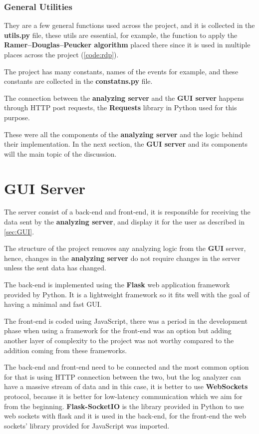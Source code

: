 \subsubsection{General Utilities}
They are a few general functions used across the project, and it is collected in the \textbf{utils.py} file,
these utils are essential, for example, the function to apply the \textbf{Ramer–Douglas–Peucker algorithm}
placed there since it is used in multiple places across the project (\ref{code:rdp}).

The project has many constants, names of the events for example, and these constants are collected in the
\textbf{constatns.py} file.

The connection between the \textbf{analyzing server} and the \textbf{GUI server} happens through HTTP post requests,
the \textbf{Requests}\cite{requests_library} library in Python used for this purpose.

These were all the components of the \textbf{analyzing server} and the logic behind their implementation. In
the next section, the \textbf{GUI server} and its components will the main topic of the discussion.

\section{GUI Server}
The server consist of a back-end and front-end, it is responsible for receiving the data sent by the 
\textbf{analyzing server}, and display it for the user as described in \ref{sec:GUI}.

The structure of the project removes any analyzing logic from the \textbf{GUI} server, hence,
changes in the \textbf{analyzing server} do not require changes in the server unless the sent 
data has changed.

The back-end is implemented using the \textbf{Flask}\cite{flask} web application framework provided 
by Python. It is a lightweight framework so it fits well with the goal of having a minimal and fast
GUI.

The front-end is coded using JavaScript, there was a period in the development phase when using a framework
for the front-end was an option but adding another layer of complexity to the project was not worthy compared
to the addition coming from these frameworks.

The back-end and front-end need to be connected and the most common option for that is using HTTP connection
between the two, but the log analyzer can have a massive stream of data and in this case, it is better to use
\textbf{WebSockets} protocol, because it is better for low-latency communication which we aim for from the
beginning. \textbf{Flask-SocketIO}\cite{flask-socketio} is the library provided in Python to use web sockets with flask and it is
used in the back-end, for the front-end the web sockets' library provided for JavaScript was imported.

